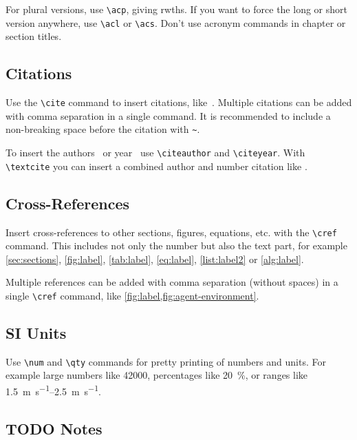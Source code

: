 For plural versions, use \texttt{\textbackslash acp}, giving \acp{rwth}. If you want to force the long or short version anywhere, use \texttt{\textbackslash acl} or \texttt{\textbackslash acs}. Don't use acronym commands in chapter or section titles.

\subsection{Citations}
\label{sec:citations}

Use the \texttt{\textbackslash cite} command to insert citations, like~\cite{sutton_reinforcement_2018}. Multiple citations can be added with comma separation in a single command. It is recommended to include a non-breaking space before the citation with \texttt{\textasciitilde}.

To insert the authors~\citeauthor{sutton_reinforcement_2018} or year~\citeyear{sutton_reinforcement_2018} use \texttt{\textbackslash citeauthor} and \texttt{\textbackslash citeyear}. With \texttt{\textbackslash textcite} you can insert a combined author and number citation like \textcite{sutton_reinforcement_2018}.

\subsection{Cross-References}
\label{sec:cross-references}

Insert cross-references to other sections, figures, equations, etc. with the \texttt{\textbackslash cref} command. This includes not only the number but also the text part, for example \cref{sec:sections}, \cref{fig:label}, \cref{tab:label}, \cref{eq:label}, \cref{list:label2} or \cref{alg:label}.

Multiple references can be added with comma separation (without spaces) in a single \texttt{\textbackslash cref} command, like \cref{fig:label,fig:agent-environment}.

\subsection{SI Units}
\label{sec:si-units}

Use \texttt{\textbackslash num} and \texttt{\textbackslash qty} commands for pretty printing of numbers and units. For example large numbers like \num{42000}, percentages like \qty{20}{\percent}, or ranges like \qtyrange{1.5}{2.5}{\meter\per\second}.

\subsection{TODO Notes}
\label{sec:todo-notes}

